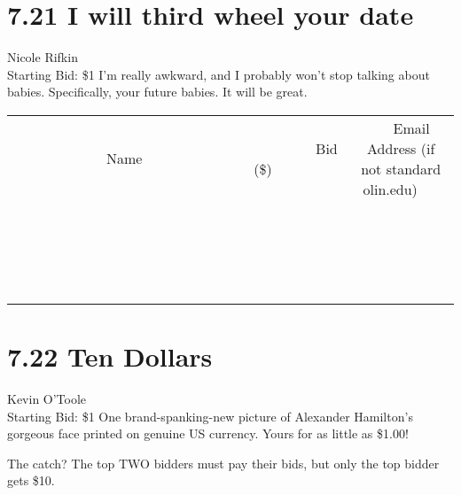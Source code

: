 \documentclass[11pt]{article}
\begin{document}
\section*{7.21 I will third wheel your date}
Nicole Rifkin
\\
Starting Bid: \$1
\newline
I'm really awkward, and I probably won't stop talking about babies. Specifically, your future babies. It will be great.
\\[3ex]
\begin{tabular}{c c c}
~~~~~~~~~~~~~Name~~~~~~~~~~~~~ & ~~~~~~~~~Bid (\$)~~~~~~~~~  & ~~~Email Address (if not standard olin.edu)~~~\\
 & & \\
\hline
 & & \\
\hline
 & & \\
\hline
 & & \\
\hline
 & & \\
\hline
 & & \\
\hline
 & & \\
\hline
 & & \\
\hline
 & & \\
\hline
 & & \\
\hline
 & & \\
\hline
 & & \\
\hline
 & & \\
\hline
 & & \\
\hline
 & & \\
\hline
 & & \\
\hline
 & & \\
\hline
 & & \\
\hline
 & & \\
\hline
\end{tabular}
\newpage
\section*{7.22 Ten Dollars}
Kevin O'Toole
\\
Starting Bid: \$1
\newline
One brand-spanking-new picture of Alexander Hamilton's gorgeous face printed on genuine US currency. Yours for as little as \$1.00!

The catch? The top TWO bidders must pay their bids, but only the top bidder gets \$10.
\end{document}
